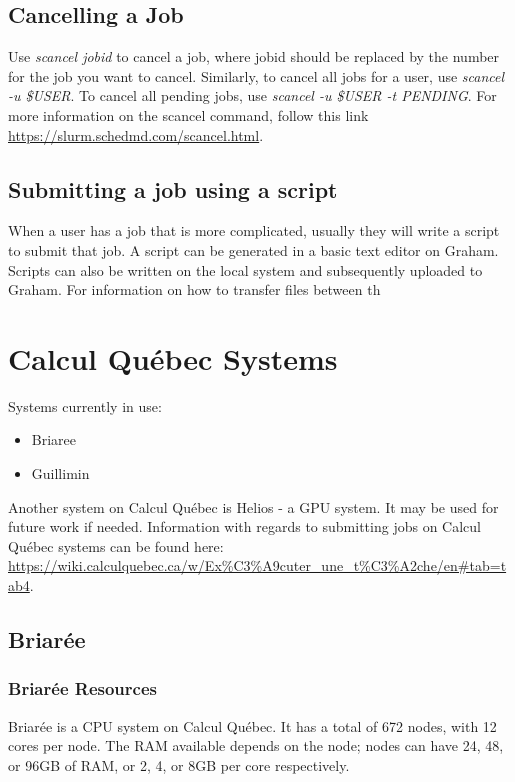 \documentclass[12pt]{article}
\begin{document}
\subsection{Cancelling a Job}

\quad Use \textit{scancel jobid} to cancel a job, where jobid should be replaced by the number for the job you want to cancel. Similarly, to cancel all jobs for a user, use \textit{scancel -u \$USER}. To cancel all pending jobs, use \textit{scancel -u \$USER -t PENDING}. For more information on the scancel command, follow this link \url{https://slurm.schedmd.com/scancel.html}.

\subsection{Submitting a job using a script}

\quad When a user has a job that is more complicated, usually they will write a script to submit that job. A script can be generated in a basic text editor on Graham. Scripts can also be written on the local system and subsequently uploaded to Graham. For information on how to transfer files between th

\newpage

\section{Calcul Qu\'{e}bec Systems}\label{CalcQ}

\quad Systems currently in use:
\begin{itemize}
\item Briaree
\item Guillimin
\end{itemize}
\quad\enskip\quad Another system on Calcul Qu\'{e}bec is Helios - a GPU system. It may be used for future work if needed. Information with regards to submitting jobs on Calcul Qu\'{e}bec systems can be found here: \url{https://wiki.calculquebec.ca/w/Ex%C3%A9cuter_une_t%C3%A2che/en#tab=tab4}. 


\subsection{Briar\'{e}e}

\subsubsection{Briar\'{e}e Resources}

\quad Briar\'{e}e is a CPU system on Calcul Qu\'{e}bec. It has a total of 672 nodes, with 12 cores per node. The RAM available depends on the node; nodes can have 24, 48, or 96GB of RAM, or 2, 4, or 8GB per core respectively.
\end{document}
